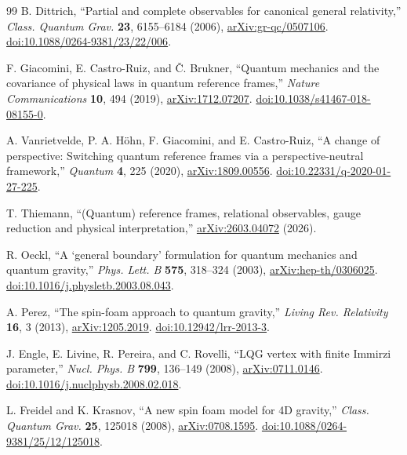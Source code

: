 \documentclass[11pt]{article}
\begin{document}
\begin{thebibliography}{99}
B. Dittrich,
``Partial and complete observables for canonical general relativity,''
\emph{Class. Quantum Grav.} \textbf{23}, 6155--6184 (2006),
\href{https://arxiv.org/abs/gr-qc/0507106}{arXiv:gr-qc/0507106}.
\href{https://doi.org/10.1088/0264-9381/23/22/006}{doi:10.1088/0264-9381/23/22/006}.

F. Giacomini, E. Castro-Ruiz, and \v{C}. Brukner,
``Quantum mechanics and the covariance of physical laws in quantum reference frames,''
\emph{Nature Communications} \textbf{10}, 494 (2019),
\href{https://arxiv.org/abs/1712.07207}{arXiv:1712.07207}.
\href{https://doi.org/10.1038/s41467-018-08155-0}{doi:10.1038/s41467-018-08155-0}.

A. Vanrietvelde, P. A. H\"ohn, F. Giacomini, and E. Castro-Ruiz,
``A change of perspective: Switching quantum reference frames via a perspective-neutral framework,''
\emph{Quantum} \textbf{4}, 225 (2020),
\href{https://arxiv.org/abs/1809.00556}{arXiv:1809.00556}.
\href{https://doi.org/10.22331/q-2020-01-27-225}{doi:10.22331/q-2020-01-27-225}.

T. Thiemann,
``(Quantum) reference frames, relational observables, gauge reduction and physical interpretation,''
\href{https://arxiv.org/abs/2603.04072}{arXiv:2603.04072} (2026).

R. Oeckl,
``A `general boundary' formulation for quantum mechanics and quantum gravity,''
\emph{Phys. Lett. B} \textbf{575}, 318--324 (2003),
\href{https://arxiv.org/abs/hep-th/0306025}{arXiv:hep-th/0306025}.
\href{https://doi.org/10.1016/j.physletb.2003.08.043}{doi:10.1016/j.physletb.2003.08.043}.

A. Perez,
``The spin-foam approach to quantum gravity,''
\emph{Living Rev. Relativity} \textbf{16}, 3 (2013),
\href{https://arxiv.org/abs/1205.2019}{arXiv:1205.2019}.
\href{https://doi.org/10.12942/lrr-2013-3}{doi:10.12942/lrr-2013-3}.

J. Engle, E. Livine, R. Pereira, and C. Rovelli,
``LQG vertex with finite Immirzi parameter,''
\emph{Nucl. Phys. B} \textbf{799}, 136--149 (2008),
\href{https://arxiv.org/abs/0711.0146}{arXiv:0711.0146}.
\href{https://doi.org/10.1016/j.nuclphysb.2008.02.018}{doi:10.1016/j.nuclphysb.2008.02.018}.

L. Freidel and K. Krasnov,
``A new spin foam model for 4D gravity,''
\emph{Class. Quantum Grav.} \textbf{25}, 125018 (2008),
\href{https://arxiv.org/abs/0708.1595}{arXiv:0708.1595}.
\href{https://doi.org/10.1088/0264-9381/25/12/125018}{doi:10.1088/0264-9381/25/12/125018}.


\end{thebibliography}
\end{document}
